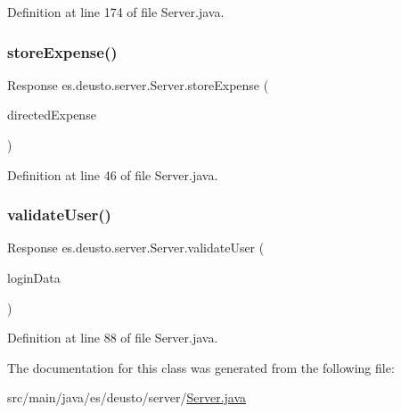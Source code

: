 Definition at line 174 of file Server.\+java.

\mbox{\label{classes_1_1deusto_1_1server_1_1_server_a1a91c5bde8d3b39fc4292dc09d62b61b}} 
\subsubsection{\texorpdfstring{store\+Expense()}{storeExpense()}}
{\footnotesize\ttfamily Response es.\+deusto.\+server.\+Server.\+store\+Expense (\begin{DoxyParamCaption}\item[{\hyperlink{classes_1_1deusto_1_1serialization_1_1_directed_message}{Directed\+Message}}]{directed\+Expense }\end{DoxyParamCaption})}



Definition at line 46 of file Server.\+java.

\mbox{\label{classes_1_1deusto_1_1server_1_1_server_a6e5f5013058ddaf970b0b21da2e32f66}} 
\subsubsection{\texorpdfstring{validate\+User()}{validateUser()}}
{\footnotesize\ttfamily Response es.\+deusto.\+server.\+Server.\+validate\+User (\begin{DoxyParamCaption}\item[{\hyperlink{classes_1_1deusto_1_1serialization_1_1_login_data}{Login\+Data}}]{login\+Data }\end{DoxyParamCaption})}



Definition at line 88 of file Server.\+java.



The documentation for this class was generated from the following file\+:\begin{DoxyCompactItemize}
\item 
src/main/java/es/deusto/server/\hyperlink{_server_8java}{Server.\+java}\end{DoxyCompactItemize}
